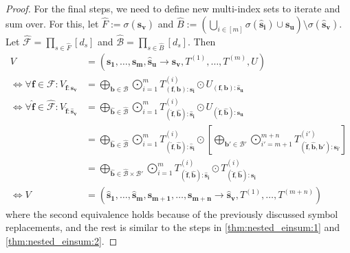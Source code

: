 \begin{proof}
    For the final steps, we need to define new multi-index sets to iterate and sum over.
    For this, let $\hat{F} := \sigma(\bm{\hat{s}_v})$ and $\hat{B} := \left(\bigcup_{i \in [m]} \sigma(\bm{\hat{s}_i}) \cup \bm{s_u}\right) \setminus \sigma(\bm{\hat{s}_v})$.
    Let $\mathcal{\hat{F}} = \prod_{s \in \hat{F}} [d_s]$ and $\mathcal{\hat{B}} = \prod_{s \in \hat{B}} [d_s]$.
    Then
    \begin{align*}
        V                                                                                 & = (\bm{s_1},\dots,\bm{s_m}, \bm{\hat{s}_u} \rightarrow \bm{s_v}, T^{(1)},\dots,T^{(m)}, U)                                                                                                                                                                                                                 \\
        \iff \forall \bm{f} \in \mathcal{F}: V_{\bm{f}: \bm{s_v}}                         & = \bigoplus\limits_{\bm{b} \in \mathcal{B}} \bigodot\limits_{i = 1}^{m} T^{(i)}_{(\bm{f}, \bm{b}):\bm{s_i}} \odot U_{(\bm{f}, \bm{b}):\bm{\hat{s}_u}}                                                                                                                                                      \\
        \iff \forall \bm{\hat{f}} \in \mathcal{\hat{F}}: V_{\bm{\hat{f}}: \bm{\hat{s}_v}} & = \bigoplus\limits_{\bm{\hat{b}} \in \mathcal{\hat{B}}} \bigodot\limits_{i = 1}^{m} T^{(i)}_{(\bm{\hat{f}}, \bm{\hat{b}}):\bm{\hat{s}_i}} \odot U_{(\bm{\hat{f}}, \bm{\hat{b}}):\bm{s_u}}                                                                                                                  \\
                                                                                          & = \bigoplus\limits_{\bm{\hat{b}} \in \mathcal{\hat{B}}} \bigodot\limits_{i = 1}^{m} T^{(i)}_{(\bm{\hat{f}}, \bm{\hat{b}}):\bm{\hat{s}_i}} \odot \left[\bigoplus\limits_{\bm{b'} \in \mathcal{B}'} \bigodot\limits_{i' = m + 1}^{m + n} T^{(i')}_{(\bm{\hat{f}}, \bm{\hat{b}}, \bm{b'}):\bm{s_{i'}}}\right] \\
                                                                                          & = \bigoplus\limits_{\bm{\hat{b}} \in \mathcal{\hat{B}} \times \mathcal{B}'} \bigodot\limits_{i = 1}^{m} T^{(i)}_{(\bm{\hat{f}}, \bm{\hat{b}}):\bm{\hat{s}_i}} \odot T^{(i)}_{(\bm{\hat{f}}, \bm{\hat{b}}):\bm{s_i}}                                                                                        \\
        \iff V                                                                            & = (\bm{\hat{s}_1}, \dots, \bm{\hat{s}_m}, \bm{s_{m + 1}}, \dots, \bm{s_{m + n}} \rightarrow \bm{\hat{s}_v}, T^{(1)}, \dots, T^{(m + n)})
    \end{align*}
    where the second equivalence holds because of the previously discussed symbol replacements, and the rest is similar to the steps in \autoref{thm:nested_einsum:1} and \autoref{thm:nested_einsum:2}.
\end{proof}
\bigskip